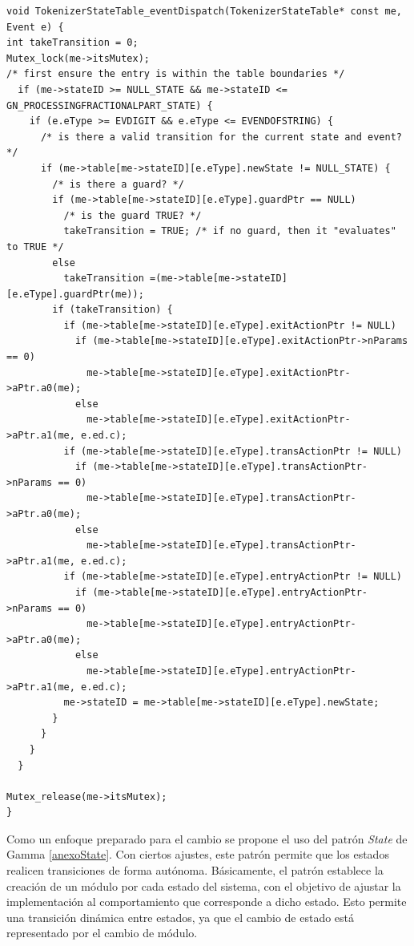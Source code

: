 \begin{lstlisting}[caption=Código ejemplo extraído de libro de Douglass State Table Pág. 305., label={ifsanidados}]
void TokenizerStateTable_eventDispatch(TokenizerStateTable* const me, Event e) {
int takeTransition = 0;
Mutex_lock(me->itsMutex);
/* first ensure the entry is within the table boundaries */
  if (me->stateID >= NULL_STATE && me->stateID <= GN_PROCESSINGFRACTIONALPART_STATE) {
    if (e.eType >= EVDIGIT && e.eType <= EVENDOFSTRING) {
      /* is there a valid transition for the current state and event? */
      if (me->table[me->stateID][e.eType].newState != NULL_STATE) {
        /* is there a guard? */
        if (me->table[me->stateID][e.eType].guardPtr == NULL)
          /* is the guard TRUE? */
          takeTransition = TRUE; /* if no guard, then it "evaluates" to TRUE */
        else
          takeTransition =(me->table[me->stateID][e.eType].guardPtr(me));
        if (takeTransition) {
          if (me->table[me->stateID][e.eType].exitActionPtr != NULL)
            if (me->table[me->stateID][e.eType].exitActionPtr->nParams == 0)
              me->table[me->stateID][e.eType].exitActionPtr->aPtr.a0(me);
            else
              me->table[me->stateID][e.eType].exitActionPtr->aPtr.a1(me, e.ed.c);
          if (me->table[me->stateID][e.eType].transActionPtr != NULL)
            if (me->table[me->stateID][e.eType].transActionPtr->nParams == 0)
              me->table[me->stateID][e.eType].transActionPtr->aPtr.a0(me);
            else
              me->table[me->stateID][e.eType].transActionPtr->aPtr.a1(me, e.ed.c);
          if (me->table[me->stateID][e.eType].entryActionPtr != NULL)
            if (me->table[me->stateID][e.eType].entryActionPtr->nParams == 0)
              me->table[me->stateID][e.eType].entryActionPtr->aPtr.a0(me);
            else
              me->table[me->stateID][e.eType].entryActionPtr->aPtr.a1(me, e.ed.c);
          me->stateID = me->table[me->stateID][e.eType].newState;
        }
      }
    }
  }

Mutex_release(me->itsMutex);
}
\end{lstlisting}


Como un enfoque preparado para el cambio se propone el uso del patrón \textit{State} de Gamma \ref{anexoState}. Con ciertos ajustes, este patrón permite que los estados realicen transiciones de forma autónoma. Básicamente, el patrón establece la creación de un módulo por cada estado del sistema, con el objetivo de ajustar la implementación al comportamiento que corresponde a dicho estado. Esto permite una transición dinámica entre estados, ya que el cambio de estado está representado por el cambio de módulo.

